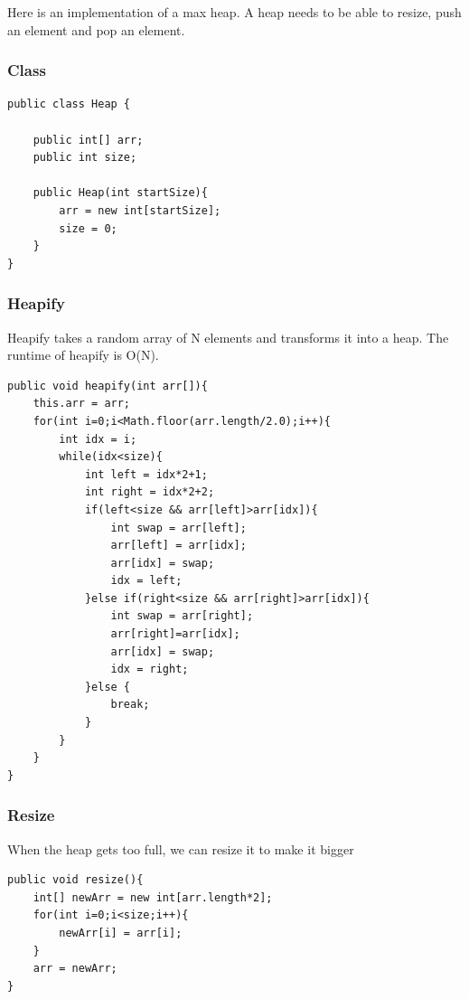 \documentclass[11pt,oneside]{book}
\begin{document}
Here is an implementation of a max heap. A heap needs to be able to resize, push an element and pop an element.

\subsubsection{Class}

\begin{lstlisting}
public class Heap {

    public int[] arr;
    public int size;
    
    public Heap(int startSize){
        arr = new int[startSize];
        size = 0;
    }
}
\end{lstlisting}

\subsubsection{Heapify}

Heapify takes a random array of N elements and transforms it into a heap. The runtime of heapify is O(N).

\begin{lstlisting}
public void heapify(int arr[]){
    this.arr = arr;
    for(int i=0;i<Math.floor(arr.length/2.0);i++){
        int idx = i;
        while(idx<size){
            int left = idx*2+1;
            int right = idx*2+2;
            if(left<size && arr[left]>arr[idx]){
                int swap = arr[left];
                arr[left] = arr[idx];
                arr[idx] = swap;
                idx = left;
            }else if(right<size && arr[right]>arr[idx]){
                int swap = arr[right];
                arr[right]=arr[idx];
                arr[idx] = swap;
                idx = right;
            }else {
                break;
            }
        }
    }
}
\end{lstlisting}

\subsubsection{Resize}

When the heap gets too full, we can resize it to make it bigger

\begin{lstlisting}
public void resize(){
    int[] newArr = new int[arr.length*2];
    for(int i=0;i<size;i++){
        newArr[i] = arr[i];
    }
    arr = newArr;
}
\end{lstlisting}
\end{document}
